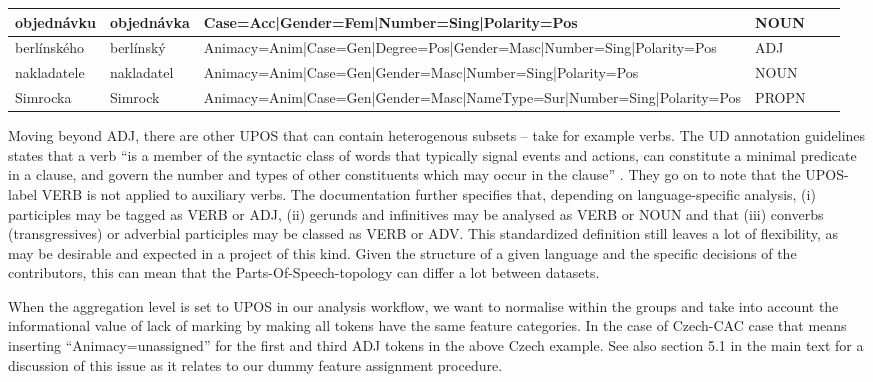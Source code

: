 \documentclass[USenglish]{article}
\begin{document}
\begin{table}[ht]
{\begin{tabular}{p{1.7cm}p{1.5cm}p{5.5cm}p{1.2cm}p{3cm}p{1cm}}
objednávku	&	objednávka	&	Case=Acc|Gender=Fem|Number=Sing|\newline{}Polarity=Pos	&	NOUN	\\ \midrule
berlínského	&	berlínský	&	Animacy=Anim|Case=Gen|Degree=Pos|\newline{}Gender=Masc|Number=Sing|Polarity=Pos	&	ADJ	\\ \midrule
nakladatele	&	nakladatel	&	Animacy=Anim|Case=Gen|\newline{}Gender=Masc|Number=Sing|Polarity=Pos	&	NOUN	\\ \midrule
Simrocka	&	Simrock	&	Animacy=Anim|Case=Gen|Gender=Masc|\newline{}NameType=Sur|Number=Sing|\newline{}Polarity=Pos	&	PROPN	\\ \bottomrule

    \end{tabular}
    }
\end{table}

Moving beyond ADJ, there are other UPOS that can contain heterogenous subsets -- take for example verbs.
The UD annotation guidelines states that a verb ``is a member of the syntactic class of words that typically signal events and actions, can constitute a minimal predicate in a clause, and govern the number and types of other constituents which may occur in the clause'' \citep{de_marneffe_verb_2022}. 
They go on to note that the UPOS-label VERB is not applied to auxiliary verbs. 
The documentation further specifies that, depending on language-specific analysis, (i) participles may be tagged as VERB or ADJ, (ii) gerunds and infinitives may be analysed as VERB or NOUN and that (iii) converbs (transgressives) or adverbial participles may be classed as VERB or ADV.
This standardized definition still leaves a lot of flexibility, as may be desirable and expected in a project of this kind.
Given the structure of a given language and the specific decisions of the contributors, this can mean that the Parts-Of-Speech-topology can differ a lot between datasets. 

When the aggregation level is set to UPOS in our analysis workflow, we want to normalise within the groups and take into account the informational value of lack of marking by making all tokens have the same feature categories. In the case of Czech-CAC case that means inserting ``Animacy=unassigned'' for the first and third ADJ tokens in the above Czech example.
See also section 5.1 in the main text
for a discussion of this issue as it relates to our dummy feature assignment procedure.
\end{document}
